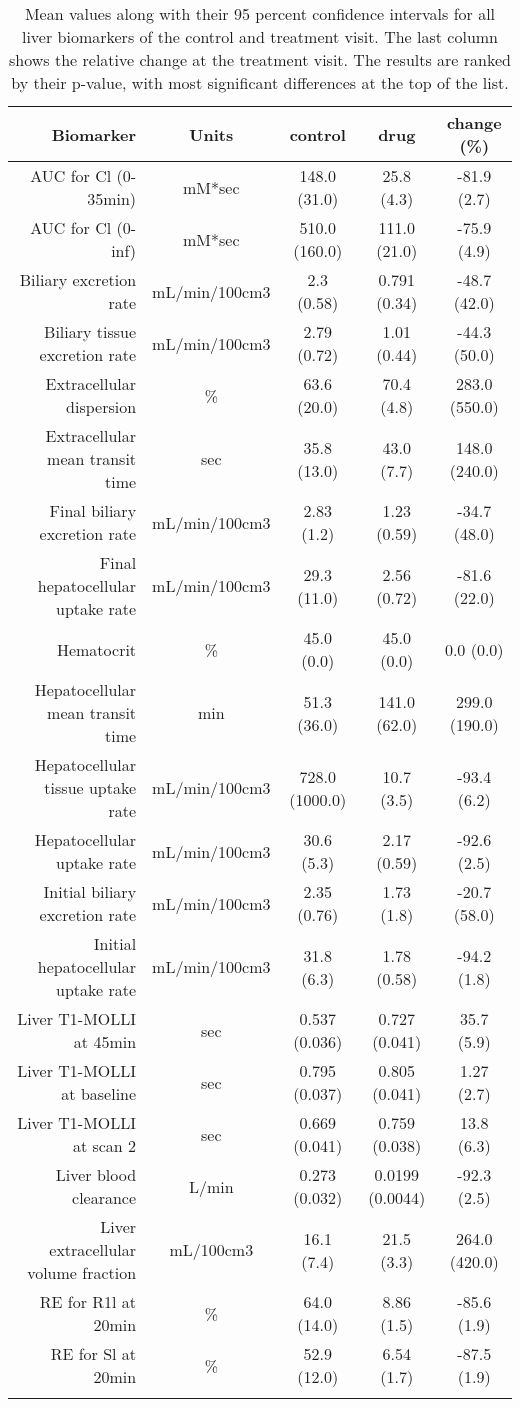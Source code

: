\documentclass{epflreport}%
\begin{document}
\begin{longtable}{rcccc}%
\hline%
Biomarker&Units&control&drug&change (\%)\\%
\hline%
AUC for Cl (0{-}35min)&mM*sec&148.0 (31.0) &25.8 (4.3) &{-}81.9 (2.7) \\%
AUC for Cl (0{-}inf)&mM*sec&510.0 (160.0) &111.0 (21.0) &{-}75.9 (4.9) \\%
Biliary excretion rate&mL/min/100cm3&2.3 (0.58) &0.791 (0.34) &{-}48.7 (42.0) \\%
Biliary tissue excretion rate&mL/min/100cm3&2.79 (0.72) &1.01 (0.44) &{-}44.3 (50.0) \\%
Extracellular dispersion&\%&63.6 (20.0) &70.4 (4.8) &283.0 (550.0) \\%
Extracellular mean transit time&sec&35.8 (13.0) &43.0 (7.7) &148.0 (240.0) \\%
Final biliary excretion rate&mL/min/100cm3&2.83 (1.2) &1.23 (0.59) &{-}34.7 (48.0) \\%
Final hepatocellular uptake rate&mL/min/100cm3&29.3 (11.0) &2.56 (0.72) &{-}81.6 (22.0) \\%
Hematocrit&\%&45.0 (0.0) &45.0 (0.0) &0.0 (0.0) \\%
Hepatocellular mean transit time&min&51.3 (36.0) &141.0 (62.0) &299.0 (190.0) \\%
Hepatocellular tissue uptake rate&mL/min/100cm3&728.0 (1000.0) &10.7 (3.5) &{-}93.4 (6.2) \\%
Hepatocellular uptake rate&mL/min/100cm3&30.6 (5.3) &2.17 (0.59) &{-}92.6 (2.5) \\%
Initial biliary excretion rate&mL/min/100cm3&2.35 (0.76) &1.73 (1.8) &{-}20.7 (58.0) \\%
Initial hepatocellular uptake rate&mL/min/100cm3&31.8 (6.3) &1.78 (0.58) &{-}94.2 (1.8) \\%
Liver T1{-}MOLLI at 45min&sec&0.537 (0.036) &0.727 (0.041) &35.7 (5.9) \\%
Liver T1{-}MOLLI at baseline&sec&0.795 (0.037) &0.805 (0.041) &1.27 (2.7) \\%
Liver T1{-}MOLLI at scan 2&sec&0.669 (0.041) &0.759 (0.038) &13.8 (6.3) \\%
Liver blood clearance&L/min&0.273 (0.032) &0.0199 (0.0044) &{-}92.3 (2.5) \\%
Liver extracellular volume fraction&mL/100cm3&16.1 (7.4) &21.5 (3.3) &264.0 (420.0) \\%
RE for R1l at 20min&\%&64.0 (14.0) &8.86 (1.5) &{-}85.6 (1.9) \\%
RE for Sl at 20min&\%&52.9 (12.0) &6.54 (1.7) &{-}87.5 (1.9) \\%
\hline%
\caption{Mean values along with their 95 percent confidence intervals for all liver biomarkers of the control and treatment visit. The last column shows the relative change at the treatment visit. The results are ranked by their p-value, with most significant differences at the top of the list.} \\%
\end{longtable}%
\clearpage%
\end{document}
